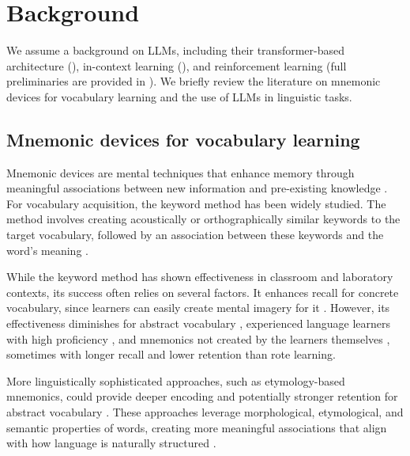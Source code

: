 \section{Background} \label{sec:background}

We assume a background on LLMs, including their transformer-based architecture (), in-context learning (), and reinforcement learning (full preliminaries are provided in ). We briefly review the literature on mnemonic devices for vocabulary learning and the use of LLMs in linguistic tasks.

\subsection{Mnemonic devices for vocabulary learning} \label{sec:mnemonic-review}


Mnemonic devices are mental techniques that enhance memory through meaningful associations between new information and pre-existing knowledge \citep{pressleyMnemonicKeywordMethod1982,PintrichROLE2002}. For vocabulary acquisition, the keyword method has been widely studied. The method involves creating acoustically or orthographically similar keywords to the target vocabulary, followed by an association between these keywords and the word's meaning \citep{atkinsonApplicationMnemonicKeyword1975}.

While the keyword method has shown effectiveness in classroom and laboratory contexts, its success often relies on several factors. It enhances recall for concrete vocabulary, since learners can easily create mental imagery for it \citep{schwanenflugelContextAvailabilityRecall1992,wangKeywordMnemonicRetention1992}. However, its effectiveness diminishes for abstract vocabulary \citep{fothMnemonicTechniqueEffectiveness1973,CamposLIMITATIONS2003},  experienced language learners with high proficiency \citep{vanhellKeywordMnemonicsRote1997,CamposUSING2011}, and mnemonics not created by the learners themselves \citep{camposImportanceKeywordGenerationMethod2004a,madanExploringWordMemorability2021}, sometimes with longer recall and lower retention than rote learning.

More linguistically sophisticated approaches, such as etymology-based mnemonics, could provide deeper encoding and potentially stronger retention for abstract vocabulary \citep{ piersonUsingEtymologyClassroom1989,akarslanEffectsTeachingWord2019, gangavarapuUsingEtymologyVocabulary2024}. These approaches leverage morphological, etymological, and semantic properties of words, creating more meaningful associations that align with how language is naturally structured \citep{zhangApplicationEtymologySemantic2013}.

